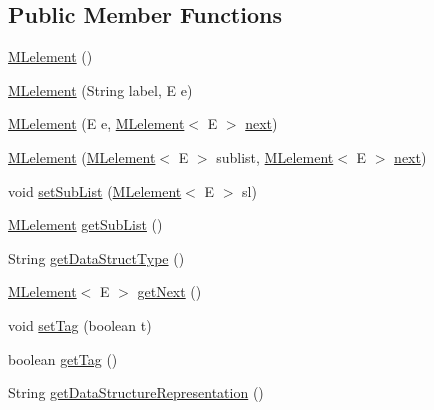 \subsection*{Public Member Functions}
\begin{DoxyCompactItemize}
\item 
\hyperlink{classbridges_1_1base_1_1_m_lelement_a721d1369c297dc3a3617a1476cb6f5f8}{M\+Lelement} ()
\item 
\hyperlink{classbridges_1_1base_1_1_m_lelement_ad0437d26107039d98cdba6277cff19e2}{M\+Lelement} (String label, E e)
\item 
\hyperlink{classbridges_1_1base_1_1_m_lelement_ad3d5fe59028cd6854eb2abceefad7f7d}{M\+Lelement} (E e, \hyperlink{classbridges_1_1base_1_1_m_lelement}{M\+Lelement}$<$ E $>$ \hyperlink{classbridges_1_1base_1_1_s_lelement_abf61c96a74ad319d561c6952ea388e0e}{next})
\item 
\hyperlink{classbridges_1_1base_1_1_m_lelement_aa660281523a7de140a0b17737096a332}{M\+Lelement} (\hyperlink{classbridges_1_1base_1_1_m_lelement}{M\+Lelement}$<$ E $>$ sublist, \hyperlink{classbridges_1_1base_1_1_m_lelement}{M\+Lelement}$<$ E $>$ \hyperlink{classbridges_1_1base_1_1_s_lelement_abf61c96a74ad319d561c6952ea388e0e}{next})
\item 
void \hyperlink{classbridges_1_1base_1_1_m_lelement_ab13a42b947edc61106ea56c8bd4e78fc}{set\+Sub\+List} (\hyperlink{classbridges_1_1base_1_1_m_lelement}{M\+Lelement}$<$ E $>$ sl)
\item 
\hyperlink{classbridges_1_1base_1_1_m_lelement}{M\+Lelement} \hyperlink{classbridges_1_1base_1_1_m_lelement_afd44cb6e17e16e13a80190747c3b7994}{get\+Sub\+List} ()
\item 
String \hyperlink{classbridges_1_1base_1_1_m_lelement_aa2e26697e2c70a36b8345a324d00679a}{get\+Data\+Struct\+Type} ()
\item 
\hyperlink{classbridges_1_1base_1_1_m_lelement}{M\+Lelement}$<$ E $>$ \hyperlink{classbridges_1_1base_1_1_m_lelement_a52ddc26a69eccda5f5b57b94cf87a545}{get\+Next} ()
\item 
void \hyperlink{classbridges_1_1base_1_1_m_lelement_a60a431ce1b27c98219924075ea764ced}{set\+Tag} (boolean t)
\item 
boolean \hyperlink{classbridges_1_1base_1_1_m_lelement_a95dd0972a3a47cc8ed361cf50508eaa1}{get\+Tag} ()
\item 
String \hyperlink{classbridges_1_1base_1_1_m_lelement_a392f05256ac08e9c19ded1387ebb7583}{get\+Data\+Structure\+Representation} ()
\end{DoxyCompactItemize}

